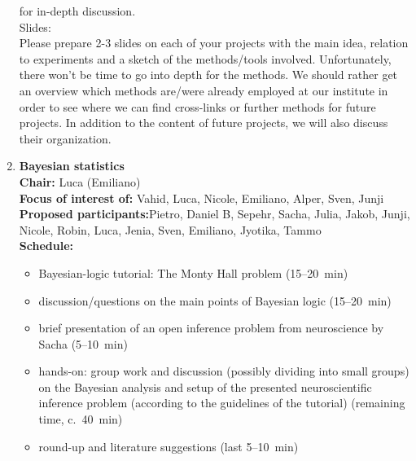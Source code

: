 \documentclass[10pt, a4paper,twoside,american]{article}
\begin{document}
\begin{enumerate}[resume]
  for in-depth discussion.\\[1ex]
  Slides:\\[1ex]
  Please prepare 2-3 slides on each of your projects with the main
  idea, relation to experiments and a sketch of the methods/tools
  involved. Unfortunately, there won't be time to go into depth for
  the methods. We should rather get an overview which methods are/were
  already employed at our institute in order to see where we can find
  cross-links or further methods for future projects. In addition to
  the content of future projects, we will also discuss their
  organization.
\item {\large\bf Bayesian statistics}\\[1ex]
  {\bf Chair:} Luca (Emiliano)\\[1ex]
  {\bf Focus of interest of:} Vahid, Luca, Nicole, Emiliano, Alper, Sven, Junji\\[1ex]
  {\bf Proposed participants:}Pietro, Daniel B, Sepehr, Sacha, Julia, Jakob, Junji, Nicole, Robin, Luca, Jenia, Sven, Emiliano, Jyotika, Tammo\\[1ex]
  {\bf Schedule:}
  \begin{itemize}
  \item Bayesian-logic tutorial: The Monty Hall problem (15--20~min)
  \item discussion/questions on the main points of Bayesian logic (15--20~min)
  \item brief presentation of an open inference problem from neuroscience by
    Sacha (5--10~min)
  \item hands-on: group work and discussion (possibly dividing into small
    groups) on the Bayesian analysis and setup of the presented
    neuroscientific inference problem (according to the guidelines of the
    tutorial) (remaining time, c.~40~min)
  \item round-up and literature suggestions (last 5--10~min)
  \end{itemize}

\end{enumerate}
\end{document}
